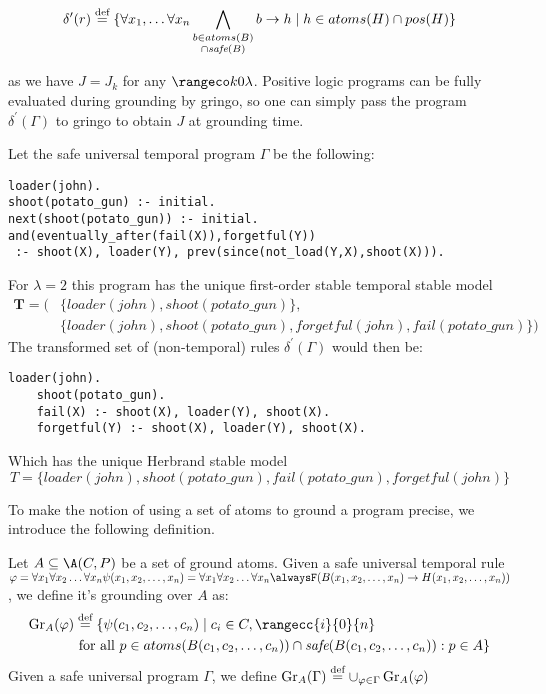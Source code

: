 \begin{equation*} \delta^{\prime}(r) \stackrel{\text{def}}{=} \{ \forall x_1, \dots \forall x_n
  \bigwedge_{\substack{b \in atoms(B)\\ \cap \textit{safe}(B)}}b
  \rightarrow h \mid h \in atoms(H) \cap pos(H)\}
\end{equation*}

as we have $J = J_k$ for any $\kinlambda$. Positive logic programs can
be fully evaluated during grounding by gringo, so one can simply pass
the program $\delta^{\prime}(\Gamma)$ to gringo to obtain $J$ at
grounding time.

\begin{example}\label{exam:shoot-nonground-safe}
  Let the safe universal temporal program $\Gamma$ be the following:
  \begin{lstlisting}[language=clingo,numbers=none]
loader(john).
shoot(potato_gun) :- initial.
next(shoot(potato_gun)) :- initial.
and(eventually_after(fail(X)),forgetful(Y)) 
 :- shoot(X), loader(Y), prev(since(not_load(Y,X),shoot(X))).
  \end{lstlisting}
  For $\lambda=2$ this program has the unique first-order stable
  temporal stable model
  \begin{align*}
  \bm{T} = (&\{ loader(john), shoot(potato\_gun) \},\\
            &\{ loader(john), shoot(potato\_gun), forgetful(john), fail(potato\_gun) \})
  \end{align*}
  The transformed set of (non-temporal) rules
  $\delta^{\prime}(\Gamma)$ would then be:
  \begin{lstlisting}[language=clingo,numbers=none]
    loader(john).
    shoot(potato_gun).
    fail(X) :- shoot(X), loader(Y), shoot(X).
    forgetful(Y) :- shoot(X), loader(Y), shoot(X).
  \end{lstlisting}
  Which has the unique Herbrand stable model
  $$
  T = \{ loader(john), shoot(potato\_gun), fail(potato\_gun), forgetful(john) \}
  $$
\end{example}

To make the notion of using a set of atoms to ground a program
precise, we introduce the following definition.

\begin{definition}
  Let $A \subseteq \A(C,P)$ be a set of ground atoms. Given a safe
  universal temporal rule
  $\varphi = \forallx \psi(x_1,x_2,\dots,x_n) = \forallx \alwaysF
  (B(x_1,x_2,\dots,x_n) \rightarrow H(x_1,x_2,\dots,x_n))$, we define
  it's grounding over $A$ as:
  \begin{align*}
    \ground{A}{\varphi}& \defeq \{ \psi(c_1,c_2,\dots,c_n) \mid c_i \in C, \rangecc{i}{0}{n}\\
    &\text{ for all } p \in atoms(B(c_1,c_2,\dots,c_n)) \cap \safe{B(c_1,c_2,\dots,c_n)}:p \in A \}
  \end{align*}
  Given a safe universal program $\Gamma$, we define
  $\operatorname{Gr}_{A}(\Gamma) \stackrel{\text{def}}{=} \cup_{\varphi \in
    \Gamma}\operatorname{Gr}_{A}(\varphi)$
\end{definition}

